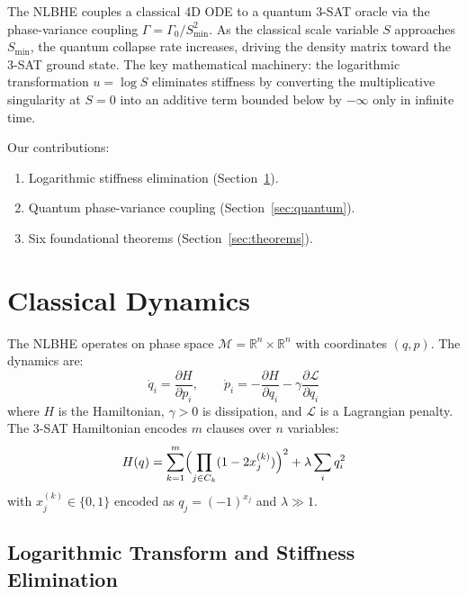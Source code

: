 \documentclass[11pt,letterpaper]{article}
\begin{document}
The NLBHE couples a classical 4D ODE to a quantum 3-SAT oracle via the phase-variance
coupling $\Gamma = \Gamma_0 / S_{\min}^2$. As the classical scale variable $S$ approaches
$S_{\min}$, the quantum collapse rate increases, driving the density matrix toward the
3-SAT ground state. The key mathematical machinery: the logarithmic transformation
$u = \log S$ eliminates stiffness by converting the multiplicative singularity at $S = 0$
into an additive term bounded below by $-\infty$ only in infinite time.

Our contributions:
\begin{enumerate}[label=(\arabic*)]
\item Logarithmic stiffness elimination (Section~\ref{sec:classical}).
\item Quantum phase-variance coupling (Section~\ref{sec:quantum}).
\item Six foundational theorems (Section~\ref{sec:theorems}).
\end{enumerate}

\section{Classical Dynamics}
\label{sec:classical}

The NLBHE operates on phase space $\mathcal{M} = \mathbb{R}^n \times \mathbb{R}^n$ with
coordinates $(q, p)$. The dynamics are:
\begin{equation}
\dot{q}_i = \frac{\partial H}{\partial p_i}, \qquad
\dot{p}_i = -\frac{\partial H}{\partial q_i} - \gamma \frac{\partial \mathcal{L}}{\partial q_i}
\label{eq:ode}
\end{equation}
where $H$ is the Hamiltonian, $\gamma > 0$ is dissipation, and $\mathcal{L}$ is a Lagrangian
penalty. The 3-SAT Hamiltonian encodes $m$ clauses over $n$ variables:
\begin{equation}
H(q) = \sum_{k=1}^m \Bigl(\prod_{j \in C_k}(1 - 2x_j^{(k)})\Bigr)^2 + \lambda\sum_i q_i^2
\label{eq:hamiltonian}
\end{equation}
with $x_j^{(k)} \in \{0,1\}$ encoded as $q_j = (-1)^{x_j}$ and $\lambda \gg 1$.

\subsection{Logarithmic Transform and Stiffness Elimination}
\end{document}
